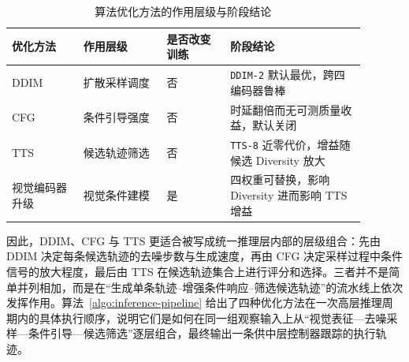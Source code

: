 \begin{table}[htbp]
    \centering
    \small
    \caption{算法优化方法的作用层级与阶段结论}
    \label{tab:optimization-role-summary}
    \begin{tabular}{p{0.18\linewidth}p{0.21\linewidth}p{0.16\linewidth}p{0.34\linewidth}}
        \toprule
        优化方法 & 作用层级 & 是否改变训练 & 阶段结论 \\
        \midrule
        DDIM & 扩散采样调度 & 否 & \texttt{DDIM-2} 默认最优，跨四编码器鲁棒 \\
        CFG & 条件引导强度 & 否 & 时延翻倍而无可测质量收益，默认关闭 \\
        TTS & 候选轨迹筛选 & 否 & \texttt{TTS-8} 近零代价，增益随候选 Diversity 放大 \\
        视觉编码器升级 & 视觉条件建模 & 是 & 四权重可替换，影响 Diversity 进而影响 TTS 增益 \\
        \bottomrule
    \end{tabular}
\end{table}

因此，DDIM、CFG 与 TTS 更适合被写成统一推理层内部的层级组合：先由 DDIM 决定每条候选轨迹的去噪步数与生成速度，再由 CFG 决定采样过程中条件信号的放大程度，最后由 TTS 在候选轨迹集合上进行评分和选择。三者并不是简单并列相加，而是在``生成单条轨迹--增强条件响应--筛选候选轨迹''的流水线上依次发挥作用。算法~\ref{algo:inference-pipeline} 给出了四种优化方法在一次高层推理周期内的具体执行顺序，说明它们是如何在同一组观察输入上从``视觉表征—去噪采样—条件引导—候选筛选''逐层组合，最终输出一条供中层控制器跟踪的执行轨迹。

